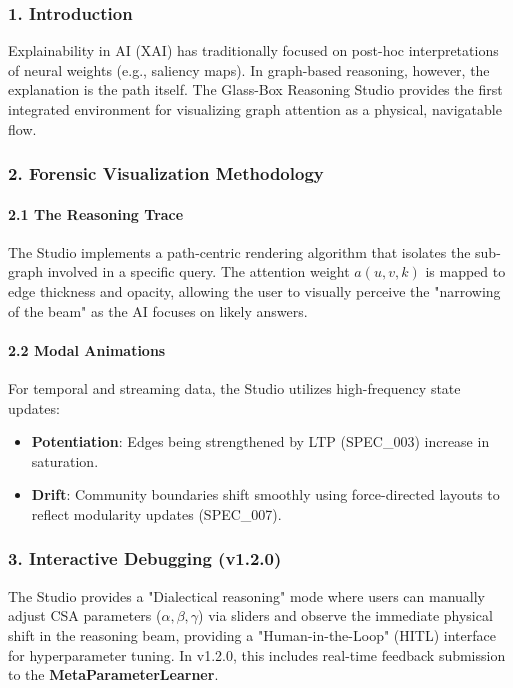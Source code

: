 \documentclass[10pt,journal,compsoc]{IEEEtran}
\begin{document}
\subsubsection{1. Introd\-uction}
Explai\-nability in AI (XAI) has tradi\-tionally focused on post-hoc inter\-pretations of neural weights (e.g., saliency maps). In graph-based reasoning, however, the explanation is the path itself. The Glass-Box Reasoning Studio provides the first integrated environment for visualizing graph attention as a physical, navigatable flow.

\subsubsection{2. Forensic Visual\-ization Methodology}

\paragraph{2.1 The Reasoning Trace}
The Studio implements a path-centric rendering algorithm that isolates the sub-graph involved in a specific query. The attention weight $a(u,v,k)$ is mapped to edge thickness and opacity, allowing the user to visually perceive the "narrowing of the beam" as the AI focuses on likely answers.

\paragraph{2.2 Modal Animations}
For temporal and streaming data, the Studio utilizes high-frequency state updates:
\begin{itemize}
\item \textbf{Potent\-iation}: Edges being stren\-gthened by LTP (SPEC\_003) increase in saturation.
\item \textbf{Drift}: Community boundaries shift smoothly using force-directed layouts to reflect modularity updates (SPEC\_007).

\end{itemize}
\subsubsection{3. Interactive Debugging (v1.2.0)}
The Studio provides a "Dialectical reasoning" mode where users can manually adjust CSA parameters ($\alpha, \beta, \gamma$) via sliders and observe the immediate physical shift in the reasoning beam, providing a "Human-in-the-Loop" (HITL) interface for hyper\-parameter tuning. In v1.2.0, this includes real-time feedback submission to the \textbf{MetaParameterLearner}.
\end{document}
